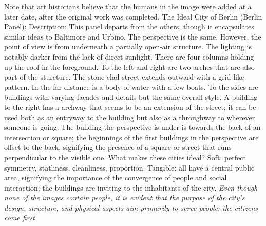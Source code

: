 \documentclass{article}
\begin{document}
\begin{outline}
                \2 Note that art historians believe that the humans in the image were added at a later date, after the original work was completed. 
            \1 The Ideal City of Berlin (Berlin Panel):
                \2 Description: This panel departs from the others, though it encapsulates similar ideas to Baltimore and Urbino. The perspective is the same. However, the point of view is from underneath a partially open-air structure. The lighting is notably darker from the lack of direct sunlight. There are four columns holding up the roof in the foreground. To the left and right are two arches that are also part of the sturcture. The stone-clad street extends outward with a grid-like pattern. In the far distance is a body of water with a few boats. To the sides are buildings with varying facades and details but the same overall style. A building to the right has a archway that seems to be an extension of the street; it can be used both as an entryway to the building but also as a throughway to wherever someone is going. The building the perspective is under is towards the back of an intersection or square; the beginnings of the first buildings in the perspective are offset to the back, signifying the presence of a square or street that runs perpendicular to the visible one. 
            \1 What makes these cities ideal? 
                \2 Soft: perfect symmetry, statliness, cleanliness, proportion. 
                \2 Tangible: all have a central public area, signifying the importance of the convergence of people and social interaction; the buildings are inviting to the inhabitants of the city. 
                \2 \textit{Even though none of the images contain people, it is evident that the purpose of the city's design, structure, and physical aspects aim primarily to serve people; the citizens come first. }
        \end{outline}
\end{document}
